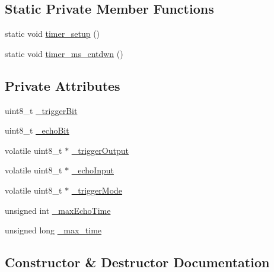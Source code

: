 \subsection*{Static Private Member Functions}
\begin{DoxyCompactItemize}
\item 
static void \mbox{\hyperlink{class_new_ping_a8cfefcf91475e546f3c12efb9a90d1ca}{timer\+\_\+setup}} ()
\item 
static void \mbox{\hyperlink{class_new_ping_a28f65f8a4496bbb91048d8714dfac86e}{timer\+\_\+ms\+\_\+cntdwn}} ()
\end{DoxyCompactItemize}
\subsection*{Private Attributes}
\begin{DoxyCompactItemize}
\item 
uint8\+\_\+t \mbox{\hyperlink{class_new_ping_abf178ee257a94b6e446d7cc065c0dd7a}{\+\_\+trigger\+Bit}}
\item 
uint8\+\_\+t \mbox{\hyperlink{class_new_ping_a0d36ad3bdb5cdc14fba6fee0d99286b9}{\+\_\+echo\+Bit}}
\item 
volatile uint8\+\_\+t $\ast$ \mbox{\hyperlink{class_new_ping_af0092b725d895673fb3d4c01e89992ed}{\+\_\+trigger\+Output}}
\item 
volatile uint8\+\_\+t $\ast$ \mbox{\hyperlink{class_new_ping_a3cc016f4cbeec318ed9198037b4035c5}{\+\_\+echo\+Input}}
\item 
volatile uint8\+\_\+t $\ast$ \mbox{\hyperlink{class_new_ping_adad3a763d59af120949a74e60a4ef9a5}{\+\_\+trigger\+Mode}}
\item 
unsigned int \mbox{\hyperlink{class_new_ping_aff39ea978a9a7ad4612c661e84ce216f}{\+\_\+max\+Echo\+Time}}
\item 
unsigned long \mbox{\hyperlink{class_new_ping_a54d56a64eeb78d180cc509cefcd87b0e}{\+\_\+max\+\_\+time}}
\end{DoxyCompactItemize}


\subsection{Constructor \& Destructor Documentation}
\mbox{\label{class_new_ping_ad517c7800c66b0a9f3c175d881776aff}} 
